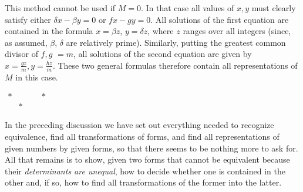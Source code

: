 This method cannot be used if $M=0$. In that case all values of $x,y$ must clearly satisfy either $\delta x-\beta y=0$ or $fx-gy=0$. All solutions of the first equation are contained in the formula $x=\beta z$, $y=\delta z$, where $z$ ranges over all integers (since, as assumed, $\beta$, $\delta$ are relatively prime). Similarly, putting the greatest common divisor of $f,g$ $=m$, all solutions of the second equation are given by $x=\frac{gz}{m},y=\frac{hz}{m}$. These two general formulas therefore contain all representations of $M$ in this case.

\begin{center}
\(\begin{matrix} *&\qquad&*\\[-0.8ex]&*&\end{matrix}\)
\end{center}

In the preceding discussion we have set out everything needed to recognize equivalence, find all transformations of forms, and find all representations of given numbers by given forms, so that there seems to be nothing more to ask for. All that remains is to show, given two forms that cannot be equivalent because their \textit{determinants are unequal}, how to decide whether one is contained in the other and, if so, how to find all transformations of the former into the latter.

